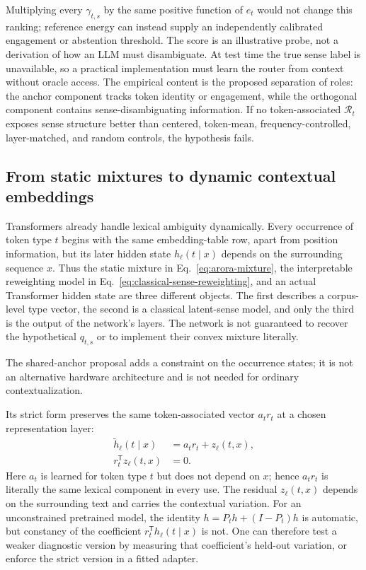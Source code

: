 \documentclass[
  aps,
  reprint,
  superscriptaddress,
  floatfix,
  nofootinbib,
  longbibliography
]{revtex4-2}
\newcommand{\T}{^{\mathsf{T}}}
\begin{document}
%
Multiplying every $\gamma_{t,s}$ by the same positive function of $e_t$ would not
change this ranking; reference energy can instead supply an independently
calibrated engagement or abstention threshold.  The score is an illustrative
probe, not a derivation of how an LLM
must disambiguate.  At test time the true sense label is unavailable, so a
practical implementation must learn the router from context without oracle
access.  The empirical content is the proposed separation of roles: the
anchor component tracks token identity or engagement, while the orthogonal
component contains sense-disambiguating information. If no token-associated
$\mathcal R_t$ exposes sense structure better than centered, token-mean,
frequency-controlled, layer-matched, and random controls, the hypothesis
fails.

\subsection{From static mixtures to dynamic contextual embeddings}
\label{sec:dynamic}

Transformers already handle lexical ambiguity dynamically.  Every occurrence
of token type $t$ begins with the same embedding-table row, apart from position
information, but its later hidden state $h_\ell(t\mid x)$ depends on the
surrounding sequence $x$.  Thus the static mixture in
Eq.~\eqref{eq:arora-mixture}, the interpretable reweighting model in
Eq.~\eqref{eq:classical-sense-reweighting}, and an actual Transformer hidden
state are three different objects.  The first describes a corpus-level type
vector, the second is a classical latent-sense model, and only the third is the
output of the network's layers.  The network is not guaranteed to recover the
hypothetical $q_{t,s}$ or to implement their convex mixture literally.

The shared-anchor proposal adds a constraint on the occurrence states; it is
not an alternative hardware architecture and is not needed for ordinary
contextualization.

Its strict form preserves the same token-associated vector $a_t r_t$ at a
chosen representation layer:
%
\begin{align}
\label{eq:layer-decomp}
\widetilde h_\ell(t\mid x)
&=a_t r_t+z_\ell(t,x),\\
r_t\T z_\ell(t,x)&=0 .\nonumber
\end{align}
%
Here $a_t$ is learned for token type $t$ but does not depend on $x$; hence
$a_t r_t$ is literally the same lexical component in every use.  The residual
$z_\ell(t,x)$ depends on the surrounding text and carries the contextual
variation.  For an unconstrained pretrained model, the identity
$h=P_th+(I-P_t)h$ is automatic, but constancy of the coefficient
$r_t\T h_\ell(t\mid x)$ is not.  One can therefore test a weaker diagnostic
version by measuring that coefficient's held-out variation, or enforce the
strict version in a fitted adapter.
\end{document}
